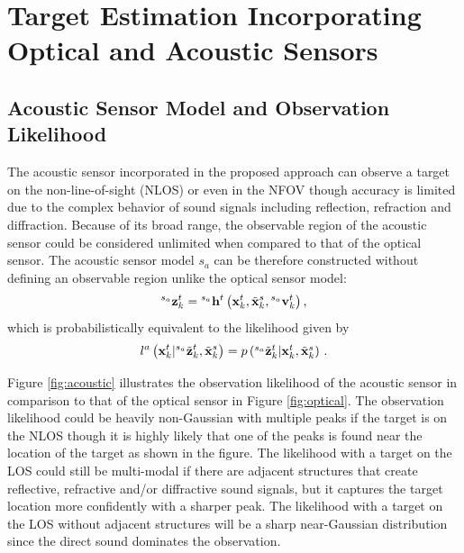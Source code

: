 \section{Target Estimation Incorporating Optical and Acoustic Sensors}
\label{sec:acoustic}
\subsection{Acoustic Sensor Model and Observation Likelihood}
The acoustic sensor incorporated in the proposed approach can observe a target on the non-line-of-sight (NLOS) or even in the NFOV though accuracy is limited due to the complex behavior of sound signals including reflection, refraction and diffraction.  Because of its broad range, the observable region of the acoustic sensor could be considered unlimited when compared to that of the optical sensor.  The acoustic sensor model $s_a$ can be therefore constructed without defining an observable region unlike the optical sensor model: 
\begin{equation}\label{eq:acoustic_sensor_model}
{}^{s_a}\mathbf{z}_{k}^{t} = {}^{s_a}\mathbf{h}^{t} \left ( \mathbf{x}_{k}^{t},\tilde {\mathbf{x}}_{k}^{s},{}^{s_a}\mathbf{v}_{k}^{t} \right ), 
\end{equation}
which is probabilistically equivalent to the likelihood given by 
\begin{equation}\label{eq:acoustic_likelihood}
l^{a} \left ( \mathbf{x}_{k}^{t}|{}^{s_a}\tilde {\mathbf{z}}_{k}^{t},\tilde {\mathbf{x}}_{k}^{s} \right ) = \mbox{$ {p} \left ( {}^{s_a}\tilde {\mathbf{z}}_{k}^{t}|\mathbf{x}_{k}^{t},\tilde {\mathbf{x}}_{k}^{s} \right )$ }. 
\end{equation}

Figure \ref{fig:acoustic} illustrates the observation likelihood of the acoustic sensor in comparison to that of the optical sensor in Figure \ref{fig:optical}.  The observation likelihood could be heavily non-Gaussian with multiple peaks if the target is on the NLOS though it is highly likely that one of the peaks is found near the location of the target as shown in the figure.  The likelihood with a target on the LOS could still be multi-modal if there are adjacent structures that create reflective, refractive and/or diffractive sound signals, but it captures the target location more confidently with a sharper peak.  The likelihood with a target on the LOS without adjacent structures will be a sharp near-Gaussian distribution since the direct sound dominates the observation.  

